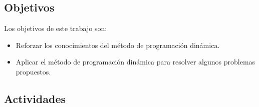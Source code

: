 \documentclass[a4paper, 12pt]{article}
\begin{document}
\subsection{Objetivos}

Los objetivos de este trabajo son:
\begin{itemize}
  \item
        Reforzar los conocimientos del método de programación dinámica.
  \item
        Aplicar el método de programación dinámica para resolver algunos problemas propuestos.
\end{itemize}

\subsection{Actividades}
\end{document}
